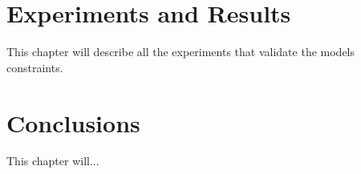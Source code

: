 \documentclass[
papersize=a4,
pagelayout=default,
fontname=latinmodern,
fontsize=11pt,
twoside,
final,
faculty=fpms,
]{umons-Thesis}
\begin{document}
	\chapter{Experiments and Results}
	This chapter will describe all the experiments that validate the models constraints.
	
	
	\chapter{Conclusions}
	This chapter will...
	
	
	
	
	\backmatter
	
	
\end{document}
